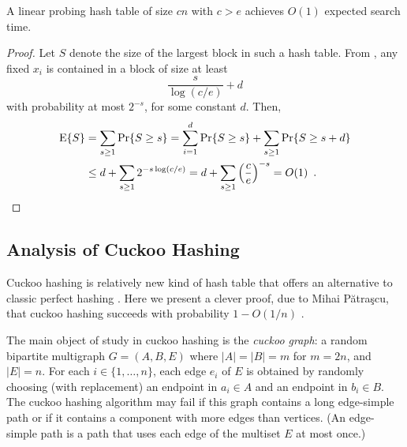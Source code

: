 \documentclass{patmorin}
\begin{document}
\begin{cor}
  A linear probing hash table of size $cn$ with $c > e$ achieves
  $O(1)$ expected search time.
\end{cor}
\begin{proof}
  Let $S$ denote the size of the largest block in such a hash
  table. From , any fixed $x_i$ is contained in
  a block of size at least
  \[
  \frac{s}{\log (c/e)} + d
  \]
  with probability at most $2^{-s}$, for some constant $d$. Then,
  \begin{align*}
    \mathrm{E}\{S\} &= \sum_{s \ge 1} \Pr\{S \ge s\} = \sum_{i=1}^d \Pr\{S \ge s\} + \sum_{s \ge 1} \Pr\{S \ge s + d\} \\
            &\le d + \sum_{s \ge 1} 2^{-s \log (c/e)} = d + \sum_{s \ge 1} \left(\frac{c}{e}\right)^{-s} = O(1) \enspace . \qedhere
  \end{align*}
\end{proof}

\subsection{Analysis of Cuckoo Hashing}

Cuckoo hashing is relatively new kind of hash table that offers an
alternative to classic perfect hashing \cite{pagh.rodler:cuckoo}. Here
we present a clever proof, due to Mihai Pătraşcu, that cuckoo hashing
succeeds with probability $1-O(1/n)$ \cite{patrascu:cuckoo}.

The main object of study in cuckoo hashing is the \emph{cuckoo graph}:
a random bipartite multigraph $G=(A,B,E)$ where $|A|=|B|=m$ for
$m = 2n$, and $|E|=n$.  For each $i\in\{1,\ldots,n\}$, each edge $e_i$
of $E$ is obtained by randomly choosing (with replacement) an endpoint
in $a_i\in A$ and an endpoint in $b_i\in B$.  The cuckoo hashing
algorithm may fail if this graph contains a long edge-simple path or
if it contains a component with more edges than vertices.  (An
edge-simple path is a path that uses each edge of the multiset $E$ at
most once.)
\end{document}
